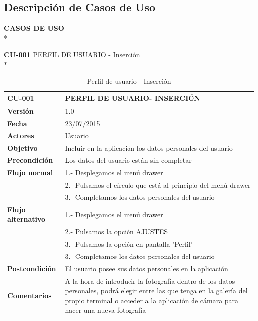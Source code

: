 \documentclass[../pfc.tex]{subfiles}
\begin{document}
	\subsection{Descripción de Casos de Uso}
	
	\textbf{CASOS DE USO}\\*
	
	\textbf{CU-001} PERFIL DE USUARIO - Inserción\\*
	
	\begin{table}[H]
		\centering
		\begin{tabular}[t]{|p{3cm}|p{9.5cm}|}
				\hline \textbf{CU-001} & \textbf{PERFIL DE USUARIO- INSERCIÓN} \\*
				\hline\hline \textbf{Versión} & 1.0 \\*
				\hline\hline \textbf{Fecha} & 23/07/2015 \\*
				\hline\textbf{Actores} 	& Usuario\\*
				\hline \textbf{Objetivo} & Incluir en la aplicación los datos personales del usuario\\* 			
				\hline \textbf{Precondición} & Los datos del usuario están sin completar \\* 
				\hline \textbf{Flujo normal} & 1.- Desplegamos el menú drawer \\* 
											 & 2.- Pulsamos el círculo que está al principio del menú drawer \\*	
											 & 3.- Completamos los datos personales del usuario\\*	
				\hline \textbf{Flujo alternativo} & 1.- Desplegamos el menú drawer \\* 
 												  & 2.- Pulsamos la opción AJUSTES \\*	
												  & 3.- Pulsamos la opción en pantalla 'Perfil' \\*	
												  & 3.- Completamos los datos personales del usuario \\*	
				\hline \textbf{Postcondición} & El usuario posee sus datos personales en la aplicación \\* 
				\hline \textbf{Comentarios}   & A la hora de introducir la fotografía dentro de los datos personales, podrá elegir entre las que tenga en la galería del propio terminal o acceder a la aplicación de cámara para hacer una nueva fotografía\\*
				\hline
			\end{tabular}
			\caption{Perfil de usuario - Inserción}
			\label{tabla:caso001}
	\end{table}
		
\end{document}

